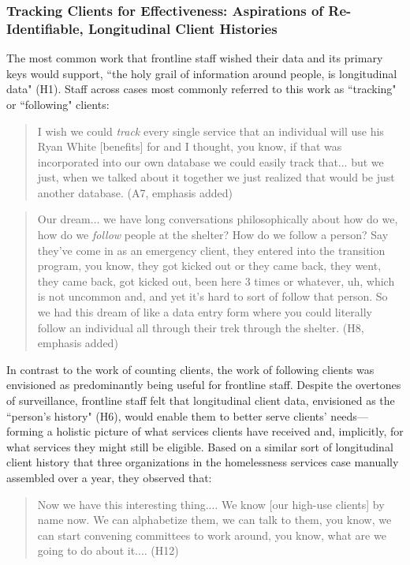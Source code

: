\subsubsection{Tracking Clients for Effectiveness: Aspirations of Re-Identifiable, Longitudinal Client Histories}

The most common work that frontline staff wished their data and its primary keys would support, ``the holy grail of information around people, is longitudinal data" (H1). Staff across cases most commonly referred to this work as ``tracking" or ``following" clients:

\begin{quote}\singlespacing I wish we could \textit{track} every single service that an individual will use his Ryan White [benefits] for and I thought, you know, if that was incorporated into our own database we could easily track that... but we just, when we talked about it together we just realized that would be just another database. (A7, emphasis added)\end{quote}

\begin{quote}\singlespacing Our dream... we have long conversations philosophically about how do we, how do we \textit{follow} people at the shelter? How do we follow a person?  Say they've come in as an emergency client, they entered into the transition program, you know, they got kicked out or they came back, they went, they came back, got kicked out, been here 3 times or whatever, uh, which is not uncommon and, and yet it's hard to sort of follow that person.  So we had this dream of like a data entry form where you could literally follow an individual all through their trek through the shelter. (H8, emphasis added)\end{quote}

In contrast to the work of counting clients, the work of following clients was envisioned as predominantly being useful for frontline staff. Despite the overtones of surveillance, frontline staff felt that longitudinal client data, envisioned as the ``person's history" (H6), would enable them to better serve clients' needs---forming a holistic picture of what services clients have received and, implicitly, for what services they might still be eligible. Based on a similar sort of longitudinal client history that three organizations in the homelessness services case manually assembled over a year, they observed that:

\begin{quote}\singlespacing Now we have this interesting thing.... We know [our high-use clients] by name now. We can alphabetize them, we can talk to them, you know, we can start convening committees to work around, you know, what are we going to do about it.... (H12)\end{quote}

